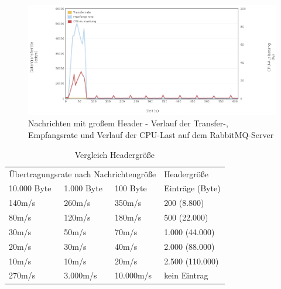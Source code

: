 \documentclass[	a4paper,
			11pt,
			oneside,
			parskip]{scrartcl}
\begin{document}
		\begin{figure}[!htb]
			\centering
			\includegraphics[width=\textwidth]{img/header/header_server2.png}
			\caption{Nachrichten mit großem Header - Verlauf der Transfer-, Empfangsrate und Verlauf der CPU-Last auf dem RabbitMQ-Server}
			\label{fig:header-server2}
		\end{figure}
				
		\begin{table}[!htb]
			\centering
			\begin{tabular}{p{3cm}ll|p{3cm}}
				\multicolumn{3}{l|}{Übertragungsrate nach Nachrichtengröße}  & Headergröße     \\
				10.000 Byte          & 1.000 Byte              & 100 Byte    & Einträge (Byte) \\ \hline
				140m/s               & 260m/s                  & 350m/s      & 200 (8.800)     \\
				80m/s                & 120m/s                  & 180m/s      & 500 (22.000)    \\
				30m/s                & 50m/s                   & 70m/s       & 1.000 (44.000)  \\
				20m/s                & 30m/s                   & 40m/s       & 2.000 (88.000)  \\
				10m/s                & 10m/s                   & 20m/s       & 2.500 (110.000) \\ \hline
				270m/s               & 3.000m/s                & 10.000m/s   & kein Eintrag
			\end{tabular}
			\caption{Vergleich Headergröße}
		\end{table}
	
\end{document}
